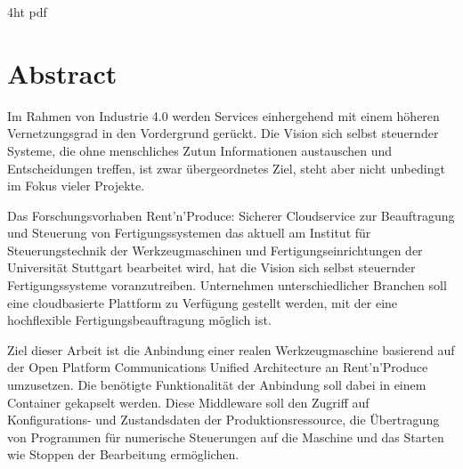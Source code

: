 \documentclass[
a4paper,
twoside,
bibliography=totoc,
headsepline,
cleardoublepage=empty,
parskip=half,
draft=false
]{scrbook}
\begin{document}
	
	\iftex4ht
	\Configure{$}{\PicMath}{\EndPicMath}{}
	{pdf}
	{%
	}
	\fi
	
	
	
	
	
	\Titelblatt
	
	\pagestyle{preamble}
	\renewcommand*{\chapterpagestyle}{preamble}
	
	\section*{Abstract}
	
		Im Rahmen von Industrie 4.0 werden Services einhergehend mit einem höheren Vernetzungsgrad in den Vordergrund gerückt. Die Vision sich selbst steuernder Systeme, die ohne menschliches Zutun Informationen austauschen und Entscheidungen treffen, ist zwar übergeordnetes Ziel, steht aber nicht unbedingt im Fokus vieler Projekte.
		
		Das Forschungsvorhaben \glqq Rent'n'Produce: Sicherer Cloudservice zur Beauftragung und Steuerung von Fertigungssystemen\grqq{} das aktuell am Institut für Steuerungstechnik der Werkzeugmaschinen und Fertigungseinrichtungen der Universität Stuttgart bearbeitet wird, hat die Vision sich selbst steuernder Fertigungssysteme voranzutreiben. Unternehmen unterschiedlicher Branchen soll eine cloudbasierte Plattform zu Verfügung gestellt werden, mit der eine hochflexible Fertigungsbeauftragung möglich ist.
		
		Ziel dieser Arbeit ist die Anbindung einer realen Werkzeugmaschine basierend auf der Open Platform Communications Unified Architecture an Rent'n'Produce umzusetzen. Die benötigte Funktionalität der Anbindung soll dabei in einem Container gekapselt werden. Diese Middleware soll den Zugriff auf Konfigurations- und Zustandsdaten der Produktionsressource, die Übertragung von Programmen für numerische Steuerungen auf die Maschine und das Starten wie Stoppen der Bearbeitung ermöglichen.
		
\end{document}
